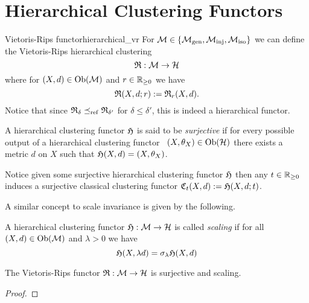 \chapter{Hierarchical Clustering Functors}
\label{chapter__hierarchical}

\begin{defprop}{Vietoris-Rips functor}{hierarchical_vr}
For $\mathcal{M} \in \{{\mathcal{M}_\mathrm{gen}},{\mathcal{M}_\mathrm{inj}},{\mathcal{M}_\mathrm{iso}}\}$ we can define the Vietoris-Rips hierarchical clustering
$$
\mathfrak{R}: \mathcal{M} \to \mathcal{H}
$$
where for $(X,d) \in \mathrm {Ob}(\mathcal{M})$ and $r \in \mathbb R_{\geq0}$ we have
$$
\mathfrak{R}(X,d; r) := \mathfrak{R}_r(X,d).
$$
Notice that since $\mathfrak{R}_\delta \preceq_\mathrm{ref} \mathfrak{R}_{\delta'}$ for $\delta \leq \delta'$, this is indeed a hierarchical functor.
\end{defprop}


\begin{definition}{}{}
    A hierarchical clustering functor $\mathfrak{H}$ is said to be \emph{surjective} if for every possible output of a hierarchical clustering functor \ie\ $(X, \theta_X) \in \mathrm {Ob}(\mathcal{H})$ there exists a metric $d$ on $X$ such that $\mathfrak{H}(X,d) = (X, \theta_X)$.
\end{definition}

Notice given some surjective hierarchical clustering functor $\mathfrak{H}$ then any $t \in \mathbb R_{\geq0}$ induces a surjective classical clustering functor $\mathfrak{C}_t(X,d) := \mathfrak{H}(X, d; t)$.

 
A similar concept to scale invariance is given by the following.

\begin{definition}{}{}
A hierarchical clustering functor $\mathfrak{H}: \mathcal{M} \to \mathcal{H}$ is called \emph{scaling} if for all $(X,d) \in \mathrm {Ob}(\mathcal{M})$ and $\lambda > 0$ we have
$$
\mathfrak{H}(X, \lambda d) = \sigma_\lambda \mathfrak{H}(X,d)
$$
\end{definition}

\begin{proposition}{}{}
The Vietoris-Rips functor $\mathfrak{R}: \mathcal{M} \to \mathcal{H}$ is surjective and scaling.
\end{proposition}

\begin{proof}
\end{proof}



